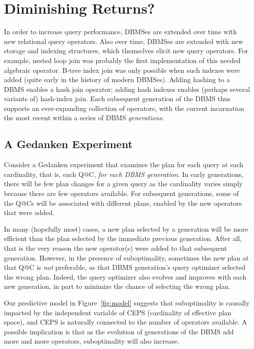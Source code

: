 \documentclass[prodmode,acmtods]{acmsmall}
\begin{document}
\section{Diminishing Returns?}\label{sec:diminishing}
In order to increase query performance, \hbox{DBMSes} are extended over time
with new \hbox{relational} query operators. Also over time, \hbox{DBMSes}
are extended with new storage and indexing structures, which themselves
elicit new query operators. For example, nested loop join was probably the
first implementation of this needed algebraic operator. B-tree index join
was only possible when such indexes were added (quite early in the history
of modern DBMSes). Adding hashing to a DBMS enables a hash join operator;
adding hash indexes enables (perhaps several variants of) hash-index join. Each
subsequent generation of the \hbox{DBMS} thus supports an ever-expanding
collection of operators, with the current incarnation the most recent
within a series of \hbox{DBMS} {\em generations}.

\subsection{A Gedanken Experiment}\label{sec:gedanken}
Consider a Gedanken experiment that examines the plan for each query at
each cardinality, that is, each Q@C, {\em for each \hbox{DBMS} generation}. In early
generations, there will be few plan changes for a given query as the cardinality varies
simply \hbox{because} there are few operators available. For
subsequent generations, some of the Q@Cs will be associated with different plans,
enabled by the new operators that were added.

In many (hopefully most) cases, a new plan selected by a generation will be
more efficient than the plan selected by the immediate previous
generation. After all, that is the very reason the new operator(s) were
added to that subsequent generation.  However, in the presence of
suboptimality, sometimes the new plan at that Q@C is {\em not} preferable,
as that \hbox{DBMS} generation's query optimizer selected the wrong plan.
Indeed, the query optimizer also evolves and improves with each new
generation, in part to minimize the chance of selecting the wrong plan.

Our predictive model in Figure~\ref{fig:model} suggests that suboptimality is causally impacted by the
independent variable of CEPS (cardinality of effective plan space), and CEPS
is naturally connected to the number of operators available. A possible implication
is that as the evolution of generations of the \hbox{DBMS} add more and more
operators, suboptimality will also increase.
\end{document}
